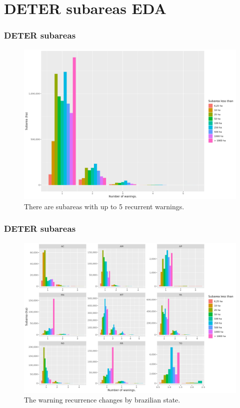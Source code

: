 \documentclass[aspectratio=169]{beamer}
\begin{document}
\section{DETER subareas EDA}


\begin{frame}
    \frametitle{DETER subareas}
    \begin{figure}[h] 
        \includegraphics[width=0.7\linewidth]
        {./figures/plot_deter_subarea_by_nwarnings.png}
        \caption{There are subareas with up to 5 recurrent warnings.}
        \label{fig:deter_subareas_nwarnings}
    \end{figure}
\end{frame}

\begin{frame}
    \frametitle{DETER subareas}
    \begin{figure}[h] 
        \includegraphics[width=0.65\linewidth]
        {./figures/plot_deter_subarea_by_warnings_state.png}
        \caption{The warning recurrence changes by brazilian state.}
        \label{fig:deter_subarea_warnings_state}
    \end{figure}
\end{frame}
\end{document}
